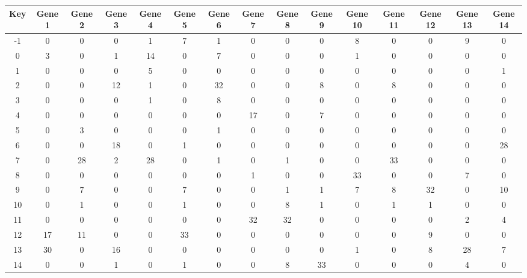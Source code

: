 \begin{tabular}{|c|c|c|c|c|c|c|c|c|c|c|c|c|c|c|}
\hline
Key & Gene 1 & Gene 2 & Gene 3 & Gene 4 & Gene 5 & Gene 6 & Gene 7 & Gene 8 & Gene 9 & Gene 10 & Gene 11 & Gene 12 & Gene 13 & Gene 14 \\
\hline
-1 & 0 & 0 & 0 & 1 & 7 & 1 & 0 & 0 & 0 & 8 & 0 & 0 & 9 & 0 \\
0 & 3 & 0 & 1 & 14 & 0 & 7 & 0 & 0 & 0 & 1 & 0 & 0 & 0 & 0 \\
1 & 0 & 0 & 0 & 5 & 0 & 0 & 0 & 0 & 0 & 0 & 0 & 0 & 0 & 1 \\
2 & 0 & 0 & 12 & 1 & 0 & 32 & 0 & 0 & 8 & 0 & 8 & 0 & 0 & 0 \\
3 & 0 & 0 & 0 & 1 & 0 & 8 & 0 & 0 & 0 & 0 & 0 & 0 & 0 & 0 \\
4 & 0 & 0 & 0 & 0 & 0 & 0 & 17 & 0 & 7 & 0 & 0 & 0 & 0 & 0 \\
5 & 0 & 3 & 0 & 0 & 0 & 1 & 0 & 0 & 0 & 0 & 0 & 0 & 0 & 0 \\
6 & 0 & 0 & 18 & 0 & 1 & 0 & 0 & 0 & 0 & 0 & 0 & 0 & 0 & 28 \\
7 & 0 & 28 & 2 & 28 & 0 & 1 & 0 & 1 & 0 & 0 & 33 & 0 & 0 & 0 \\
8 & 0 & 0 & 0 & 0 & 0 & 0 & 1 & 0 & 0 & 33 & 0 & 0 & 7 & 0 \\
9 & 0 & 7 & 0 & 0 & 7 & 0 & 0 & 1 & 1 & 7 & 8 & 32 & 0 & 10 \\
10 & 0 & 1 & 0 & 0 & 1 & 0 & 0 & 8 & 1 & 0 & 1 & 1 & 0 & 0 \\
11 & 0 & 0 & 0 & 0 & 0 & 0 & 32 & 32 & 0 & 0 & 0 & 0 & 2 & 4 \\
12 & 17 & 11 & 0 & 0 & 33 & 0 & 0 & 0 & 0 & 0 & 0 & 9 & 0 & 0 \\
13 & 30 & 0 & 16 & 0 & 0 & 0 & 0 & 0 & 0 & 1 & 0 & 8 & 28 & 7 \\
14 & 0 & 0 & 1 & 0 & 1 & 0 & 0 & 8 & 33 & 0 & 0 & 0 & 4 & 0 \\
\hline
\end{tabular}